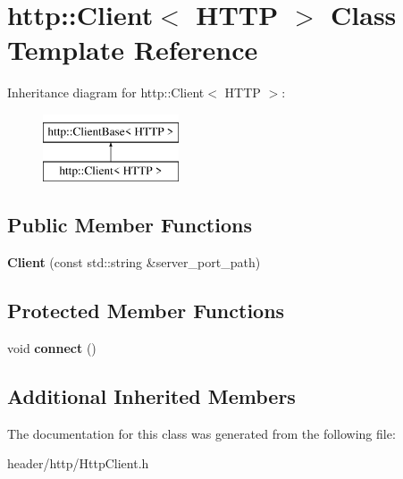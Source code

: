 \hypertarget{classhttp_1_1_client_3_01_h_t_t_p_01_4}{}\section{http\+:\+:Client$<$ H\+T\+TP $>$ Class Template Reference}
\label{classhttp_1_1_client_3_01_h_t_t_p_01_4}
Inheritance diagram for http\+:\+:Client$<$ H\+T\+TP $>$\+:\begin{figure}[H]
\begin{center}
\leavevmode
\includegraphics[height=2.000000cm]{d4/da7/classhttp_1_1_client_3_01_h_t_t_p_01_4}
\end{center}
\end{figure}
\subsection*{Public Member Functions}
\begin{DoxyCompactItemize}
\item 
\mbox{\label{classhttp_1_1_client_3_01_h_t_t_p_01_4_a1ff860c7e44f554b04022fed43dcdf94}} 
{\bfseries Client} (const std\+::string \&server\+\_\+port\+\_\+path)
\end{DoxyCompactItemize}
\subsection*{Protected Member Functions}
\begin{DoxyCompactItemize}
\item 
\mbox{\label{classhttp_1_1_client_3_01_h_t_t_p_01_4_a356b4f8f63662c9e5bb22895ed2fe7f3}} 
void {\bfseries connect} ()
\end{DoxyCompactItemize}
\subsection*{Additional Inherited Members}


The documentation for this class was generated from the following file\+:\begin{DoxyCompactItemize}
\item 
header/http/Http\+Client.\+h\end{DoxyCompactItemize}
